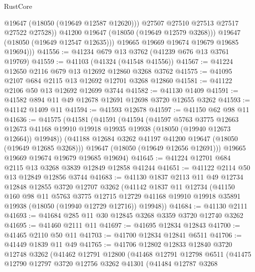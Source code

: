 \begin{lexlean}{RustCore}
\begin{coremodule}
                    @19647
                    (@18050 (@19649 @12587 @12620)))
                  @27507
                  @27510
                  @27513
                  @27517
                  @27522
                  @27528))
              @41200
              @19647
              (@18050 (@19649 @12579 @3268)))
            @19647
            (@18050 (@19649 @12547 @12635)))
          @19665
          @19669
          @19674
          @19679
          @19685
          @19694)))
@41556 := @41234 @679 @13 @3762 (@41239 @676 @13 @3761 @19769)
@41559 := @41103 (@41324 (@41548 @41556))
@41567 := @41224 @12650 @2116 @679 @13 @12692 @12860 @3268 @3762
@41575 := @41095 @2107 @684 @2115 @13 @12692 @12701 @3268 @12860
@41581 := @41122 @2106 @50 @13 @12692 @12699 @3744
@41582 := @41130 @1409
@41591 := @41582 @894 @11 @49 @12678 @12691 @12698 @3720 @12655 @3262
@41593 := @41142 @1409 @11
@41594 := @41593 @12678
@41597 := @41150 @62 @98 @11
@41636 := @41575
    (@41581
      (@41591
        (@41594
          (@41597
            @5763
            @3775
            @12663
            @12673
            @41168
            @19910
            @19918
            @19935
            @19938
            (@18050 (@19940 @12673 @12664))
            @19948))
        (@41188 @12684 @3262 @41197 @41200 @19647 (@18050 (@19649 @12685 @3268)))
        @19647
        (@18050 (@19649 @12656 @12691)))
      @19665
      @19669
      @19674
      @19679
      @19685
      @19694)
@41645 := @41224 @12701 @684 @2115 @13 @3268 @3839 @12849 @12858 @41244
@41651 := @41122 @2114 @50 @13 @12849 @12856 @3744
@41683 := @41130
    @1837
    @2113
    @11
    @49
    @12734
    @12848
    @12855
    @3720
    @12707
    @3262
    (@41142
      @1837
      @11
      @12734
      (@41150
        @160
        @98
        @11
        @5763
        @3775
        @12715
        @12729
        @41168
        @19910
        @19918
        @35891
        @19938
        (@18050 (@19940 @12729 @12716))
        @19948))
@41684 := @41130 @2111
@41693 := @41684 @285 @11 @30 @12845 @3268 @3359 @3720 @12740 @3262
@41695 := @41460 @2111 @11
@41697 := @41695 @12834 @12843
@41700 := @41465 @2110 @50 @11
@41703 := @41700 @12834 @12841 @6511
@41706 := @41449 @1839 @11 @49
@41765 := @41706
    @12802
    @12833
    @12840
    @3720
    @12748
    @3262
    (@41462
      @12791
      @12800
      (@41468
        @12791
        @12798
        @6511
        (@41475
          @12790
          @12797
          @3720
          @12756
          @3262
          @41301
          (@41484
            @12787
            @3268

\end{coremodule}
\end{lexlean}
